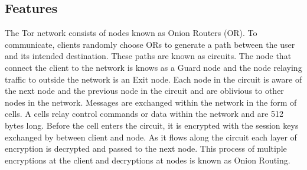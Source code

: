 \documentclass{llncs}
\begin{document}
\subsection{Features}
The Tor network consists of nodes known as Onion Routers (OR). To communicate, clients randomly choose ORs to generate a path between the user and its intended destination. These paths are known as circuits. The node that connect the client to the network is knows as a Guard node and the node relaying traffic to outside the network is an Exit node. Each node in the circuit is aware of the next node and the previous node in the circuit and are oblivious to other nodes in the network. Messages are exchanged within the network in the form of cells. A cells relay control commands or data within the network and are 512 bytes long. Before the cell enters the circuit, it is encrypted with the session keys exchanged by between client and node. As it flows along the circuit each layer of encryption is decrypted and passed to the next node. This process of multiple encryptions at the client and decryptions at nodes is known as Onion Routing. 
\end{document}
